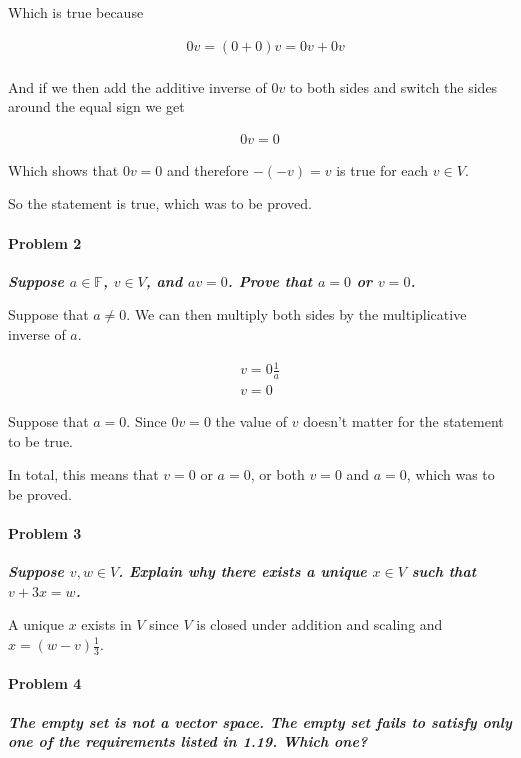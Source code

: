 Which is true because

\begin{align*}
	&0v = (0 + 0)v = 0v + 0v \\
\end{align*}

And if we then add the additive inverse of $0v$ to both sides and switch the sides around the equal sign we get

\begin{align*}
	0v = 0
\end{align*}

Which shows that $0v = 0$ and therefore $-(-v) = v$ is true for each $v \in V$.

So the statement is true, which was to be proved.

\paragraph{Problem 2}
\textbf{\textit{Suppose $a \in \mathbb{F}$, $v \in V$, and $av = 0$. Prove that $a = 0$ or $v = 0$.}}

Suppose that $a \neq 0$. We can then multiply both sides by the multiplicative inverse of $a$.

\begin{align*}
	v = 0\frac{1}{a} \\
	v = 0
\end{align*}

Suppose that $a = 0$. Since $0v = 0$ the value of $v$ doesn't matter for the statement to be true. 

In total, this means that $v = 0$ or $a = 0$, or both $v = 0$ and $a = 0$, which was to be proved.

\paragraph{Problem 3}
\textbf{\textit{Suppose $v,w \in V$. Explain why there exists a unique $x \in V$ such that $v + 3x = w$.}}

A unique $x$ exists in $V$ since $V$ is closed under addition and scaling and $x = (w-v)\frac{1}{3}$.

\paragraph{Problem 4} 
\textbf{\textit{The empty set is not a vector space. The empty set fails to satisfy only one of the requirements listed in 1.19. Which one?}}

